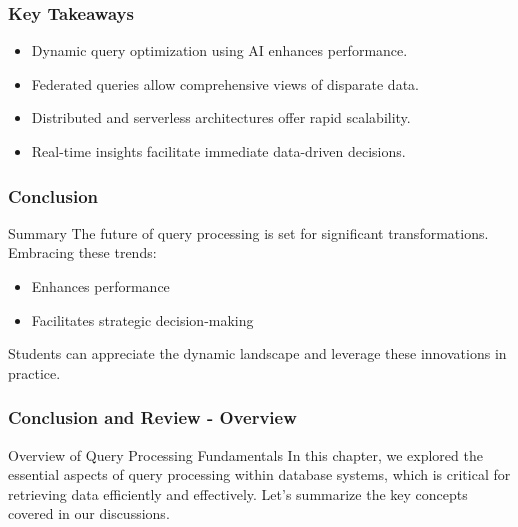 \documentclass[aspectratio=169]{beamer}
\begin{document}
\begin{frame}[fragile]
    \frametitle{Key Takeaways}
    \begin{itemize}
        \item Dynamic query optimization using AI enhances performance.
        \item Federated queries allow comprehensive views of disparate data.
        \item Distributed and serverless architectures offer rapid scalability.
        \item Real-time insights facilitate immediate data-driven decisions.
    \end{itemize}
\end{frame}

\begin{frame}[fragile]
    \frametitle{Conclusion}
    \begin{block}{Summary}
        The future of query processing is set for significant transformations. Embracing these trends:
        \begin{itemize}
            \item Enhances performance
            \item Facilitates strategic decision-making
        \end{itemize}
        Students can appreciate the dynamic landscape and leverage these innovations in practice.
    \end{block}
\end{frame}

\begin{frame}[fragile]
    \frametitle{Conclusion and Review - Overview}
    \begin{block}{Overview of Query Processing Fundamentals}
        In this chapter, we explored the essential aspects of query processing within database systems, which is critical for retrieving data efficiently and effectively. Let’s summarize the key concepts covered in our discussions.
    \end{block}
\end{frame}
\end{document}
